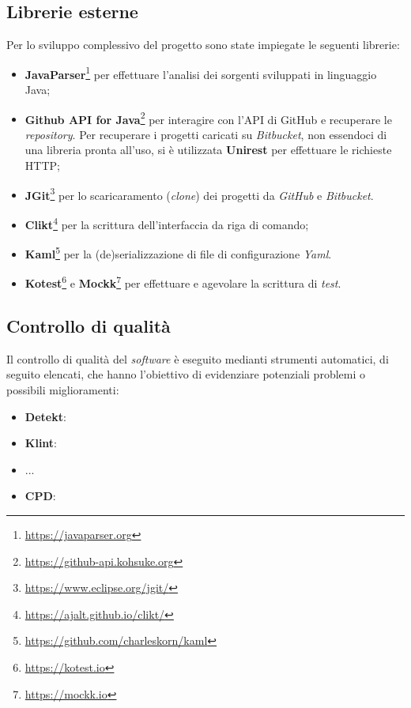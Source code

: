 \subsection*{Librerie esterne}
Per lo sviluppo complessivo del progetto sono state impiegate le seguenti librerie:
\begin{itemize}
	\item \textbf{JavaParser}\footnote{\url{https://javaparser.org}} per effettuare l'analisi dei sorgenti sviluppati in linguaggio Java;
	\item \textbf{Github API for Java}\footnote{\url{https://github-api.kohsuke.org}} per interagire con l'API di GitHub e recuperare le \textit{repository}. Per recuperare i progetti caricati su \textit{Bitbucket}, non essendoci di una libreria pronta all'uso, si è utilizzata \textbf{Unirest} per effettuare le richieste HTTP;
	\item \textbf{JGit}\footnote{\url{https://www.eclipse.org/jgit/}} per lo scaricaramento (\textit{clone}) dei progetti da \textit{GitHub} e \textit{Bitbucket}.
	\item \textbf{Clikt}\footnote{\url{https://ajalt.github.io/clikt/}} per la scrittura dell'interfaccia da riga di comando;
	\item \textbf{Kaml}\footnote{\url{https://github.com/charleskorn/kaml}} per la (de)serializzazione di file di configurazione \textit{Yaml}.
	\item \textbf{Kotest}\footnote{\url{https://kotest.io}} e \textbf{Mockk}\footnote{\url{https://mockk.io}} per effettuare e agevolare la scrittura di \textit{test}.
\end{itemize}

\subsection*{Controllo di qualità}
Il controllo di qualità del \textit{software} è eseguito medianti strumenti automatici, di seguito elencati, che hanno l'obiettivo di evidenziare potenziali problemi o possibili miglioramenti:
\begin{itemize}
	\item \textbf{Detekt}: 
	\item \textbf{Klint}:
	\item ...
	\item \textbf{CPD}:
\end{itemize}
